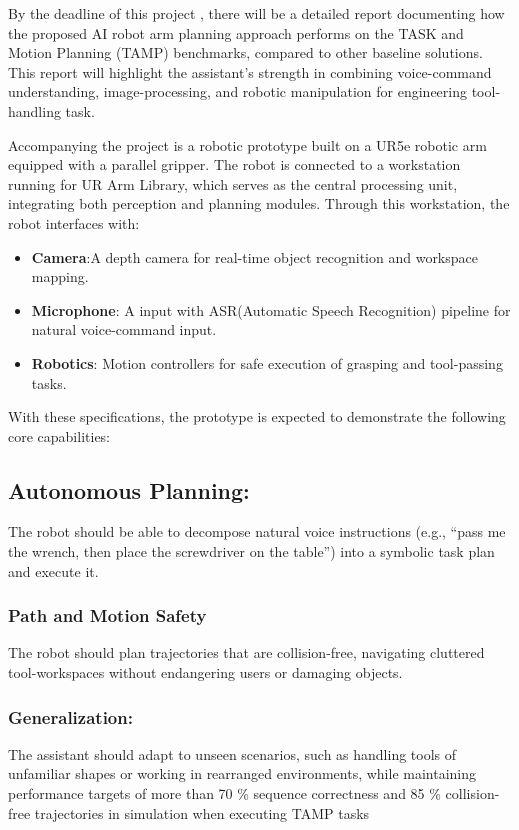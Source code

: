 \documentclass[12pt]{extarticle}
\begin{document}
By the deadline of this project , there will be a detailed report documenting how the proposed AI robot arm planning approach performs on the TASK and Motion Planning (TAMP) benchmarks, compared to other baseline solutions. This report will highlight the assistant's strength in combining voice-command understanding, image-processing, and robotic manipulation for engineering tool-handling task.

Accompanying the project is a robotic prototype built on a UR5e robotic arm equipped with a parallel gripper. The robot is connected to a workstation running for UR Arm Library, which serves as the central processing unit, integrating both perception and planning modules. Through this workstation, the robot interfaces with:

\begin{itemize}
    \item \textbf{Camera}:A depth camera for real-time object recognition and workspace mapping.
    \item \textbf{Microphone}: A input with ASR(Automatic Speech Recognition) pipeline for natural voice-command input.
    \item \textbf{Robotics}: Motion controllers for safe execution of grasping and tool-passing tasks. 
\end{itemize}

With these specifications, the prototype is expected to demonstrate the following core capabilities:

\subsection{Autonomous Planning:}

The robot should be able to decompose natural voice instructions (e.g., “pass me the wrench, then place the screwdriver on the table”) into a symbolic task plan and execute it.

\subsubsection{Path and Motion Safety}
The robot should plan trajectories that are collision-free, navigating cluttered tool-workspaces without endangering users or damaging objects.

\subsubsection{Generalization:} The assistant should adapt to unseen scenarios, such as handling tools of unfamiliar shapes or working in rearranged environments, while maintaining performance targets of more than 70 \% sequence correctness and 85 \% collision-free trajectories in simulation when executing TAMP tasks~\cite{tamp}
\end{document}
